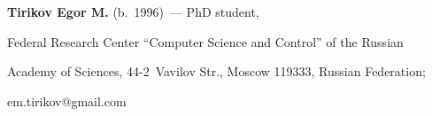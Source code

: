   \vspace*{3pt}

  

  \noindent

  \textbf{Tirikov Egor M.} (b.\ 1996)~--- PhD student, %

  Federal Research Center ``Computer Science and Control'' of the Russian 

Academy of Sciences, 44-2~Vavilov Str., Moscow 119333, Russian Federation; 

\mbox{em.tirikov@gmail.com}



\label{end\stat}



\renewcommand{\bibname}{\protect\rm Литература}   

